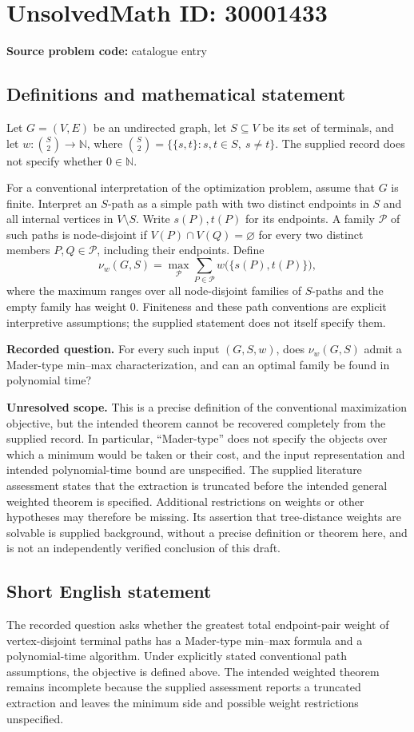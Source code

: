 \documentclass[11pt]{article}
\newcommand{\N}{\mathbb{N}}
\begin{document}
\section*{UnsolvedMath ID: 30001433}
\textbf{Source problem code:} catalogue entry
\subsection{Definitions and mathematical statement}
Let \(G=(V,E)\) be an undirected graph, let \(S\subseteq V\) be its set of terminals, and let \(w:\binom{S}{2}\to\N\), where \(\binom{S}{2}=\{\{s,t\}:s,t\in S,\ s\ne t\}\). The supplied record does not specify whether \(0\in\N\).

For a conventional interpretation of the optimization problem, assume that \(G\) is finite. Interpret an \(S\)-path as a simple path with two distinct endpoints in \(S\) and all internal vertices in \(V\setminus S\). Write \(s(P),t(P)\) for its endpoints. A family \(\mathcal P\) of such paths is node-disjoint if \(V(P)\cap V(Q)=\varnothing\) for every two distinct members \(P,Q\in\mathcal P\), including their endpoints. Define
\[
\nu_w(G,S)=\max_{\mathcal P}\sum_{P\in\mathcal P}w\bigl(\{s(P),t(P)\}\bigr),
\]
where the maximum ranges over all node-disjoint families of \(S\)-paths and the empty family has weight \(0\). Finiteness and these path conventions are explicit interpretive assumptions; the supplied statement does not itself specify them.

\textbf{Recorded question.} For every such input \((G,S,w)\), does \(\nu_w(G,S)\) admit a Mader-type min--max characterization, and can an optimal family be found in polynomial time?

\textbf{Unresolved scope.} This is a precise definition of the conventional maximization objective, but the intended theorem cannot be recovered completely from the supplied record. In particular, ``Mader-type'' does not specify the objects over which a minimum would be taken or their cost, and the input representation and intended polynomial-time bound are unspecified. The supplied literature assessment states that the extraction is truncated before the intended general weighted theorem is specified. Additional restrictions on weights or other hypotheses may therefore be missing. Its assertion that tree-distance weights are solvable is supplied background, without a precise definition or theorem here, and is not an independently verified conclusion of this draft.
\subsection{Short English statement}
The recorded question asks whether the greatest total endpoint-pair weight of vertex-disjoint terminal paths has a Mader-type min--max formula and a polynomial-time algorithm. Under explicitly stated conventional path assumptions, the objective is defined above. The intended weighted theorem remains incomplete because the supplied assessment reports a truncated extraction and leaves the minimum side and possible weight restrictions unspecified.
\end{document}

